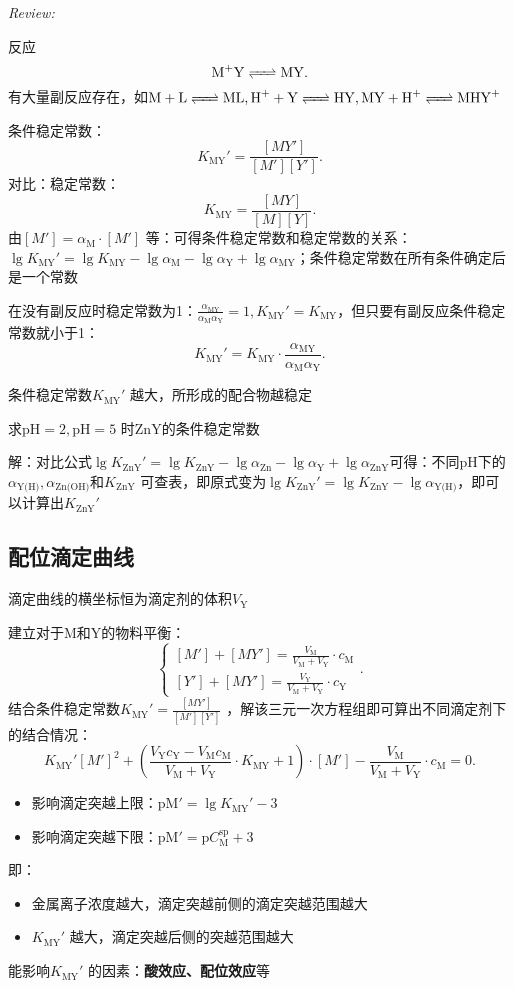 \textit{Review:}

反应\[
    \ce{M+Y}\ce{<=>[][]}\ce{MY}
.\]
有大量副反应存在，如$\ce{M +L}\ce{<=>[][]}\ce{ML},\ce{H+ +Y}\ce{<=>[][]}\ce{HY},\ce{MY +H+}\ce{<=>[][]}\ce{MHY+}$

\begin{notation}
    条件稳定常数：\[
        K_{\text{MY}}'=\frac{[MY']}{[M'][Y']}
    .\]
    对比：稳定常数：\[
        K_{\text{MY}}=\frac{[MY]}{[M][Y]}
    .\]
    由$[M']=\alpha_\text{M}\cdot [M']$ 等：可得条件稳定常数和稳定常数的关系：$\lg K_\text{MY}'=\lg K_\text{MY}-\lg\alpha_\text{M}-\lg\alpha_\text{Y}+\lg\alpha_\text{MY}$；条件稳定常数在所有条件确定后是一个常数
\end{notation}
在没有副反应时稳定常数为1：$\frac{\alpha_\text{MY}}{\alpha_\text{M}\alpha_\text{Y}}=1,K_\text{MY}'=K_\text{MY}$，但只要有副反应条件稳定常数就小于1：\[
    K_\text{MY}'=K_\text{MY}\cdot \frac{\alpha_\text{MY}}{\alpha_\text{M}\alpha_\text{Y}}
.\]
\begin{notation}
    条件稳定常数$K_{\text{MY}}'$ 越大，所形成的配合物越稳定
\end{notation}
\begin{eg}
    求$\text{pH}=2,\text{pH}=5$ 时ZnY的条件稳定常数
\end{eg}
解：对比公式$\lg K_\text{ZnY}'=\lg K_\text{ZnY}-\lg\alpha_\text{Zn}-\lg\alpha_\text{Y}+\lg\alpha_\text{ZnY}$可得：不同pH下的$\alpha_\text{Y(H)},\alpha_\text{Zn(OH)}$和$K_{\text{ZnY}}$ 可查表，即原式变为$\lg K_\text{ZnY}'=\lg K_{\text{ZnY}}-\lg\alpha_\text{Y(H)}$，即可以计算出$K_\text{ZnY}'$
\subsection{配位滴定曲线}%
\label{sub:配位滴定曲线}
\begin{notation}
    滴定曲线的横坐标恒为滴定剂的体积$V_\text{Y}$
\end{notation}
建立对于M和Y的物料平衡：\[
    \begin{cases}
        [M']+[MY']=\frac{V_\text{M}}{V_\text{M}+V_\text{Y}}\cdot c_\text{M}\\
        [Y']+[MY']=\frac{V_\text{Y}}{V_\text{M}+V_\text{Y}}\cdot c_\text{Y}
    \end{cases}
.\]
结合条件稳定常数$K_\text{MY}'=\frac{[MY']}{[M'][Y']}$ ，解该三元一次方程组即可算出不同滴定剂下的结合情况：\[
    K_\text{MY}'[M']^2 +\left( \frac{V_\text{Y}c_\text{Y}-V_\text{M}c_\text{M}}{V_\text{M}+V_\text{Y}}\cdot K_\text{MY}+1 \right)\cdot [M']-\frac{V_\text{M}}{V_\text{M}+V_\text{Y}}\cdot c_\text{M}=0
.\]
\begin{itemize}
    \item 影响滴定突越上限：$\text{pM}'=\lg K_\text{MY}'-3$
    \item 影响滴定突越下限：$\text{pM}'=\text{p}C_\text{M}^{\text{sp}}+3$
\end{itemize}
即：
\begin{itemize}
    \item 金属离子浓度越大，滴定突越前侧的滴定突越范围越大
    \item $K_\text{MY}'$ 越大，滴定突越后侧的突越范围越大
\end{itemize}
能影响$K_{\text{MY}}'$ 的因素：\textbf{酸效应、配位效应}等

